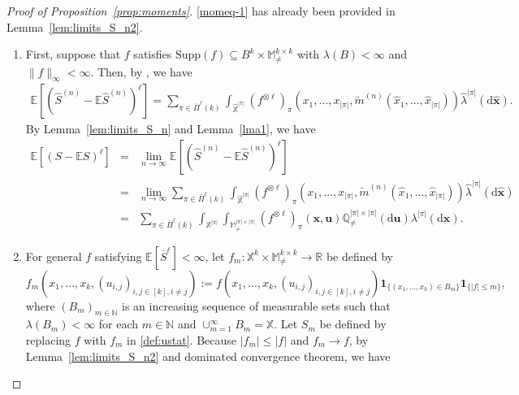\documentclass{article}
\theoremstyle{definition}
\numberwithin{equation}{section}
\theoremstyle{remark}
\newcommand{\E}{\mathbb{E}}
\newcommand{\supp}{\mathrm{Supp}}
\begin{document}
\begin{proof}[Proof of Proposition~\ref{prop:moments}]
\eqref{momeq-1} has already been provided in Lemma~\ref{lem:limits_S_n2}. 
\begin{enumerate}
\item[1)]First, suppose that $f$ satisfies $\supp(f)\subseteq B^k\times\mathbb{M}^{k\times k}_{\ne}$ with $\lambda(B)<\infty$ and $\|f\|_{\infty}<\infty$. 
Then, by \cite[Theorem~3.7]{schulte2}, we have 
\begin{eqnarray*}
\E\left[(\widehat{S}^{(n)}-\E\widehat{S}^{(n)})^{\ell}\right]=\sum_{\pi\in\overline{\Pi}^\ell(k)}\int_{\widehat{\mathbb{X}}^{|\pi|}}(f^{\otimes \ell})_{\pi}(x_1,\dots,x_{|\pi|},\tilde{m}^{(n)}(\hat{x}_1,\dots,\hat{x}_{|\pi|}))\hat{\lambda}^{|\pi|}(\mathrm{d}\bm{\hat{x}}).
\end{eqnarray*}
By Lemma~\ref{lem:limits_S_n} and Lemma~\ref{lma1}, we have
\begin{eqnarray*}
\E\left[(S-\E S)^{\ell}\right]&=&\lim_{n\to\infty}\E\left[(\widehat{S}^{(n)}-\E\widehat{S}^{(n)})^{\ell}\right]\\
&=&\lim_{n\to\infty}\sum_{\pi\in\overline{\Pi}^\ell(k)}\int_{\widehat{\mathbb{X}}^{|\pi|}}(f^{\otimes \ell})_{\pi}(x_1,\dots,x_{|\pi|},\tilde{m}^{(n)}(\hat{x}_1,\dots,\hat{x}_{|\pi|}))\hat{\lambda}^{|\pi|}(\mathrm{d}\bm{\hat{x}})\\
&=&\sum_{\pi\in\overline{\Pi}^\ell(k)}\int_{\mathbb{X}^{|\pi|}}\int_{\mathbb{M}^{|\pi|\times|\pi|}_{\ne}}(f^{\otimes\ell})_{\pi}(\bm{x},\bm{u})\mathbb{Q}^{|\pi|\times|\pi|}_{\ne}(\mathrm{d}\bm{u})\lambda^{|\pi|}(\mathrm{d}\bm{x}).
\end{eqnarray*}
\item[2)]For general $f$ satisfying $\E[\overline{S}^\ell]<\infty$, let $f_m:\mathbb{X}^k\times \mathbb{M}^{k\times k}_{\neq}\to\mathbb{R}$ be defined by 
\begin{equation*}
f_m(x_1,\ldots,x_k, (u_{i,j})_{i,j\in[k], i\neq j}):=f(x_1,\ldots,x_k, (u_{i,j})_{i,j\in[k], i\neq j})\mathbf{1}_{\{(x_1,\ldots,x_k)\in B_m\}}\mathbf{1}_{\{|f|\le m\}},
\end{equation*}
where $(B_m)_{m\in\mathbb{N}}$ is an increasing sequence of measurable sets such that $\lambda(B_m)<\infty$ for each $m\in\mathbb{N}$ and $ \cup_{m=1}^\infty B_m=\mathbb{X}$. Let $S_m$ be defined by replacing $f$ with $f_m$ in \eqref{def:ustat}. Because $|f_m|\le |f|$ and $f_m\to f$, by Lemma~\ref{lem:limits_S_n2} and dominated convergence theorem, we have 

\end{enumerate}
\end{proof}
\end{document}
